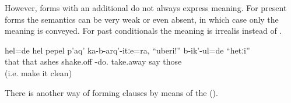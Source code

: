 However,  forms with an additional  do not always express   meaning. For present  forms the  semantics can be very weak  or even absent, in which case only the  meaning is conveyed. For past conditionals the meaning is irrealis  instead of  .
%
\begin{exe}
	\ex	\label{ex:If you let the ashes of your cigarette fall down}
	\gll	hel=de		hel	pepel	p'aq'	ka-b-arq'-itːe=ra,	``uberi!''	b-ik'-ul=de	``hetːi''\\
		that	that	ashes	shake.off	-do.	take.away	say	those\\
	\glt	{} (i.e. make it clean)
\end{exe}

There is another way of forming  clauses by means of the   ().




